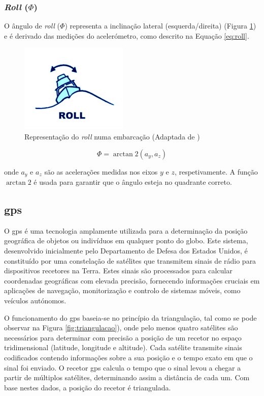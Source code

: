 \subsubsection{\emph{Roll} (\(\Phi\))}
O ângulo de \emph{roll} (\(\Phi\)) representa a inclinação lateral (esquerda/direita) (Figura \ref{fig:roll}) e é derivado das medições do acelerómetro, como descrito na Equação \ref{eq:roll}.

\begin{figure}[H]
    \centering
    \includegraphics[height=0.2\linewidth]{figuras/Roll.png}
    \caption[Representação do \emph{roll} numa embarcação]{Representação do \emph{roll} numa embarcação (Adaptada de \cite{imagem-yaw-pitch-roll})}
    \label{fig:roll}
\end{figure}

\begin{equation}
    \Phi = \arctan2{\left(a_y, a_z\right)}
    \label{eq:roll}
\end{equation}

onde \(a_y\) e \(a_z\) são as acelerações medidas nos eixos \(y\) e \(z\), respetivamente. A função \(\arctan2\) é usada para garantir que o ângulo esteja no quadrante correto.

\subsection{\acrfull{gps}} \label{subsec:gps}

O \gls{gps} é uma tecnologia amplamente utilizada para a determinação da posição geográfica de objetos ou indivíduos em qualquer ponto do globo. Este sistema, desenvolvido inicialmente pelo Departamento de Defesa dos Estados Unidos, é constituído por uma constelação de satélites que transmitem sinais de rádio para dispositivos recetores na Terra. Estes sinais são processados para calcular coordenadas geográficas com elevada precisão, fornecendo informações cruciais em aplicações de navegação, monitorização e controlo de sistemas móveis, como veículos autónomos.

O funcionamento do \gls{gps} baseia-se no princípio da triangulação, tal como se pode observar na Figura \ref{fig:triangulacao}), onde pelo menos quatro satélites são necessários para determinar com precisão a posição de um recetor no espaço tridimensional (latitude, longitude e altitude). Cada satélite transmite sinais codificados contendo informações sobre a sua posição e o tempo exato em que o sinal foi enviado. O recetor \gls{gps} calcula o tempo que o sinal levou a chegar a partir de múltiplos satélites, determinando assim a distância de cada um. Com base nestes dados, a posição do recetor é triangulada. 

